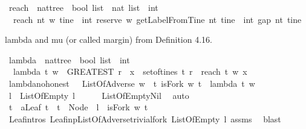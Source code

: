 \begin{isabellebody}
\isamarkupfalse%
\ reach\ {\isacharcolon}{\isacharcolon}\ {\isachardoublequoteopen}nattree\ {\isasymRightarrow}\ bool\ list\ {\isasymRightarrow}\ nat\ list\ {\isasymRightarrow}\ int{\isachardoublequoteclose}\ \isanewline
\ \ {\isachardoublequoteopen}reach\ nt\ w\ tine\ {\isacharequal}\ int\ {\isacharparenleft}reserve\ w\ {\isacharparenleft}getLabelFromTine\ nt\ tine{\isacharparenright}{\isacharparenright}\ {\isacharminus}\ int\ {\isacharparenleft}gap\ nt\ tine{\isacharparenright}{\isachardoublequoteclose}%
\begin{isamarkuptext}%
lambda and mu (or called margin) from Definition 4.16.%
\end{isamarkuptext}\isamarkuptrue%
\isamarkupfalse%
\ lambda\ {\isacharcolon}{\isacharcolon}\ {\isachardoublequoteopen}nattree\ {\isasymRightarrow}\ bool\ list\ {\isasymRightarrow}\ int{\isachardoublequoteclose}\ \isanewline
\ \ {\isachardoublequoteopen}lambda\ t\ w\ {\isacharequal}\ {\isacharparenleft}GREATEST\ r{\isachardot}\ {\isasymexists}\ x\ {\isasymin}\ set{\isacharunderscore}of{\isacharunderscore}tines\ t{\isachardot}\ r\ {\isacharequal}\ reach\ t\ w\ x{\isacharparenright}{\isachardoublequoteclose}\isanewline
\isanewline
{}\isamarkupfalse%
\ lambda{\isacharunderscore}no{\isacharunderscore}honest\ {\isacharcolon}\ \ {\isachardoublequoteopen}ListOfAdverse\ w{\isachardoublequoteclose}\ \ {\isachardoublequoteopen}{\isasymexists}t{\isachardot}\ isFork\ w\ t\ {\isasymand}\ lambda\ t\ w\ {\isasymge}\ {}{\isachardoublequoteclose}\isanewline
%
\isadelimproof
%
\endisadelimproof
%
\isatagproof
{}\isamarkupfalse%
\ {\isacharminus}\isanewline
\ \ \isamarkupfalse%
\ l\ \ {\isachardoublequoteopen}ListOfEmpty\ l{\isachardoublequoteclose}\isanewline
\ \ \ \ \isamarkupfalse%
\ ListOfEmpty{\isachardot}Nil\ \isamarkupfalse%
\ auto\ \isanewline
\ \ \isamarkupfalse%
\ t\ \ a{\isacharcolon}{\isachardoublequoteopen}Leaf\ t\ {\isasymand}\ t\ {\isacharequal}\ Node\ {}\ l\ {\isasymand}\ isFork\ w\ t{\isachardoublequoteclose}\isanewline
\ \ \ \ \isamarkupfalse%
\ Leaf{\isachardot}intros\ Leaf{\isacharunderscore}inp{\isacharunderscore}ListOfAdverse{\isacharunderscore}trivial{\isacharunderscore}fork\ {\isacartoucheopen}ListOfEmpty\ l{\isacartoucheclose}\ assms\ \isamarkupfalse%
\ blast\isanewline
\ \ \isamarkupfalse%

\end{isabellebody}

